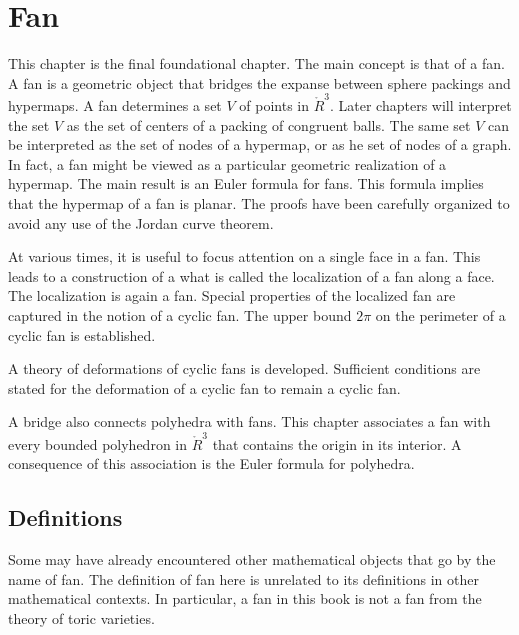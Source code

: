
\chapter{Fan}\label{sec:fan}




\begin{summary}
This chapter is the final foundational chapter.  The main concept is that of a fan.
A fan is a geometric object that bridges the expanse between sphere packings and hypermaps.  A fan determines a set $V$ of points in $\ring{R}^3$.  Later chapters will interpret the set $V$ as the set of centers of a packing of congruent balls.   The same set $V$ can be interpreted as the set of nodes of a hypermap, or as he set of nodes of a graph.  In fact, a fan might be viewed as  a particular geometric realization of a hypermap.    The main result  is an Euler formula for fans.  This formula  implies that the hypermap of a fan is planar.  The proofs have been carefully organized to avoid any use of the Jordan curve theorem.

At various times, it is useful to focus attention on a single face in a fan.  This leads to a construction of a what is called the localization of a fan along a face.  The localization is again a fan.  Special properties of the localized fan are captured in the notion of a cyclic fan.  The upper bound $2\pi$ on the perimeter of a cyclic fan is established.

A theory of deformations of cyclic fans is developed.  Sufficient conditions are stated for the deformation of a cyclic fan to remain a cyclic fan.

A bridge  also connects polyhedra with fans.  This chapter associates a fan with every bounded polyhedron in $\ring{R}^3$ that contains the origin in its interior.  A consequence of this association is the Euler formula for polyhedra.
\end{summary}


%
%
%
%
%

\section{Definitions}



\begin{remark}
Some may have already encountered other mathematical objects that go by the name of fan.
The definition of fan here is unrelated to its definitions in other mathematical contexts.   In particular, a fan in this book is not a fan from the theory of toric varieties.
\end{remark}


